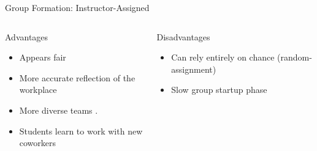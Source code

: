 \begin{frame}{Group Formation: Instructor-Assigned}
 \fontsize{10.5pt}{12}\selectfont

\begin{columns}
    \begin{column}[T, onlytextwidth]{.45\textwidth}
        \begin{alertblock}{Advantages}
            \begin{itemize}
            \item Appears fair \cite{chapman2006}
            \item More accurate reflection of the workplace \cite{chapman2006}
            \item More diverse teams \cite{pociask2017}.
            \item Students learn to work with new coworkers \cite{chapman2006}
            \end{itemize}
        \end{alertblock}
    \end{column}
            
    \begin{column}[T, onlytextwidth]{.45\textwidth}
            \begin{alertblock}{Disadvantages} \begin{itemize}
                \item Can rely entirely on chance \cite{chapman2006} (random-assignment)
                \item Slow group startup phase \cite{chapman2006}
            \end{itemize}
        \end{alertblock}
    \end{column}
\end{columns}
\end{frame}